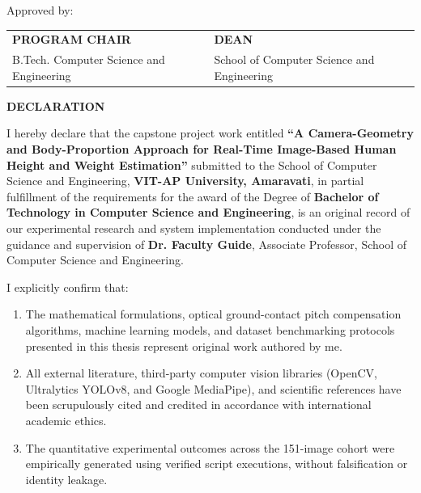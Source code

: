 \documentclass[12pt,a4paper,oneside]{report}
\begin{document}
\vspace{1.2cm}
\noindent Approved by:

\vspace{0.5cm}
\noindent\begin{tabular}{@{}p{}p{}@{}}
\textbf{PROGRAM CHAIR} & \textbf{DEAN} \\
B.Tech. Computer Science and Engineering & School of Computer Science and Engineering \\
\end{tabular}

\clearpage
\begin{center}
{\Large\bfseries DECLARATION\par}
\end{center}
\vspace{0.6cm}

\noindent I hereby declare that the capstone project work entitled \textbf{``A Camera-Geometry and Body-Proportion Approach for Real-Time Image-Based Human Height and Weight Estimation''} submitted to the School of Computer Science and Engineering, \textbf{VIT-AP University, Amaravati}, in partial fulfillment of the requirements for the award of the Degree of \textbf{Bachelor of Technology in Computer Science and Engineering}, is an original record of our experimental research and system implementation conducted under the guidance and supervision of \textbf{Dr. Faculty Guide}, Associate Professor, School of Computer Science and Engineering.

\noindent I explicitly confirm that:
\begin{enumerate}[label=(\alph*)]
    \item The mathematical formulations, optical ground-contact pitch compensation algorithms, machine learning models, and dataset benchmarking protocols presented in this thesis represent original work authored by me.
    \item All external literature, third-party computer vision libraries (OpenCV, Ultralytics YOLOv8, and Google MediaPipe), and scientific references have been scrupulously cited and credited in accordance with international academic ethics.
    \item The quantitative experimental outcomes across the 151-image cohort were empirically generated using verified script executions, without falsification or identity leakage.
\end{enumerate}
\end{document}
